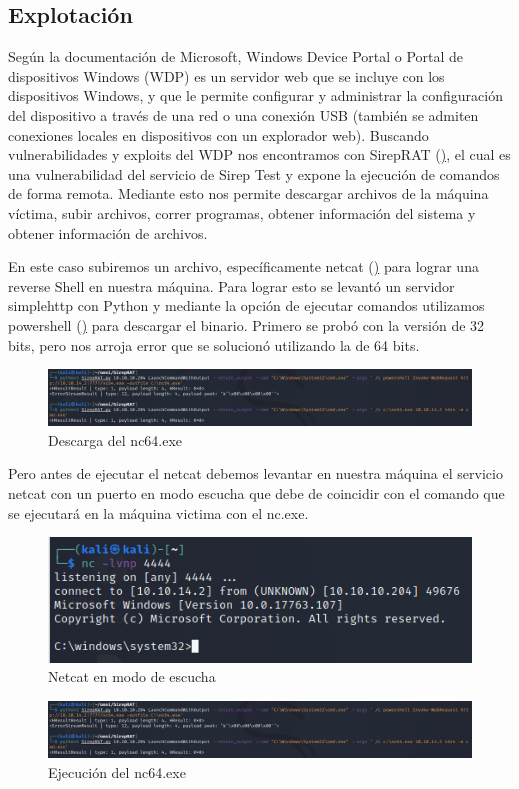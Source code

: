 \documentclass{article}
\begin{document}
\subsection{Explotación}

Según la documentación de Microsoft, Windows Device Portal o Portal de dispositivos Windows (WDP) es un servidor web que se incluye con los dispositivos Windows, y que le permite configurar y administrar la configuración del dispositivo a través de una red o una conexión USB (también se admiten conexiones locales en dispositivos con un explorador web).
Buscando vulnerabilidades y exploits del WDP nos encontramos con SirepRAT (\href{https://github.com/SafeBreach-Labs/SirepRAT}), el cual es una vulnerabilidad del servicio de Sirep Test y expone la ejecución de comandos de forma remota. Mediante esto nos permite descargar archivos de la máquina víctima, subir archivos, correr programas, obtener información del sistema y obtener información de archivos.

En este caso subiremos un archivo, específicamente netcat (\href{https://github.com/int0x33/nc.exe/}) para lograr una reverse Shell en nuestra máquina.
Para lograr esto se levantó un servidor simplehttp con Python y mediante la opción de ejecutar comandos utilizamos powershell (\href{https://academy.hackthebox.com/course/preview/file-transfers/windows-file-transfer-methods}) para descargar el binario.
Primero se probó con la versión de 32 bits, pero nos arroja error que se solucionó utilizando la de 64 bits.
\begin{figure}[H]
	\center
	\includegraphics[width=\textwidth]{images/omni/5.png}
	\caption{Descarga del nc64.exe}
\end{figure}

Pero antes de ejecutar el netcat debemos levantar en nuestra máquina el servicio netcat con un puerto en modo escucha que debe de coincidir con el comando que se ejecutará en la máquina victima con el nc.exe.
\begin{figure}[H]
	\center
	\includegraphics[width=\textwidth]{images/omni/6.png}
	\caption{Netcat en modo de escucha}
\end{figure}
\begin{figure}[H]
	\center
	\includegraphics[width=\textwidth]{images/omni/7.png}
	\caption{Ejecución del nc64.exe}
\end{figure}
\end{document}

